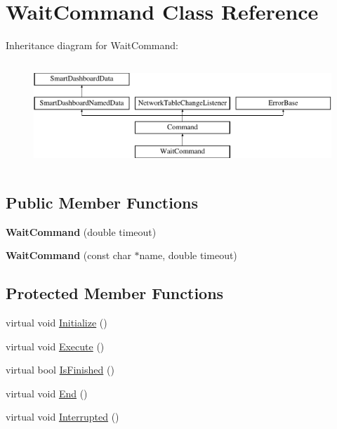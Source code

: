 \hypertarget{classWaitCommand}{
\section{WaitCommand Class Reference}
\label{classWaitCommand}
}
Inheritance diagram for WaitCommand:\begin{figure}[H]
\begin{center}
\leavevmode
\includegraphics[height=4.000000cm]{classWaitCommand}
\end{center}
\end{figure}
\subsection*{Public Member Functions}
\begin{DoxyCompactItemize}
\item 
\hypertarget{classWaitCommand_a6a2f9603b86feaea525bdb888f221607}{
{\bfseries WaitCommand} (double timeout)}
\label{classWaitCommand_a6a2f9603b86feaea525bdb888f221607}

\item 
\hypertarget{classWaitCommand_a98d963c49824d28ebc487aaaa0d5dda8}{
{\bfseries WaitCommand} (const char $\ast$name, double timeout)}
\label{classWaitCommand_a98d963c49824d28ebc487aaaa0d5dda8}

\end{DoxyCompactItemize}
\subsection*{Protected Member Functions}
\begin{DoxyCompactItemize}
\item 
virtual void \hyperlink{classWaitCommand_a272bb9b16371f8ca22c5fc807d76f1e7}{Initialize} ()
\item 
virtual void \hyperlink{classWaitCommand_ae86cf56da58179704fefe8f3a72e76b2}{Execute} ()
\item 
virtual bool \hyperlink{classWaitCommand_a118c9fa181b03cd80969a1a2b16508a5}{IsFinished} ()
\item 
virtual void \hyperlink{classWaitCommand_a440032f840a2f61bba2a9be2699227bf}{End} ()
\item 
virtual void \hyperlink{classWaitCommand_a5c88fdb4af42a240002d92eb3d9059d6}{Interrupted} ()
\end{DoxyCompactItemize}


